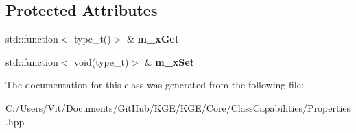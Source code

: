 \subsection*{Protected Attributes}
\begin{DoxyCompactItemize}
\item 
\hypertarget{class_k_g_e_1_1_property_typed_by_callback_a6ad7424611873868ecfe2fabb060a348}{std\-::function$<$ type\-\_\-t()$>$ \& {\bfseries m\-\_\-x\-Get}}\label{class_k_g_e_1_1_property_typed_by_callback_a6ad7424611873868ecfe2fabb060a348}

\item 
\hypertarget{class_k_g_e_1_1_property_typed_by_callback_a8b2759750d6e55429e3802123332f0f5}{std\-::function$<$ void(type\-\_\-t)$>$ \& {\bfseries m\-\_\-x\-Set}}\label{class_k_g_e_1_1_property_typed_by_callback_a8b2759750d6e55429e3802123332f0f5}

\end{DoxyCompactItemize}


The documentation for this class was generated from the following file\-:\begin{DoxyCompactItemize}
\item 
C\-:/\-Users/\-Vit/\-Documents/\-Git\-Hub/\-K\-G\-E/\-K\-G\-E/\-Core/\-Class\-Capabilities/Properties.\-hpp\end{DoxyCompactItemize}
